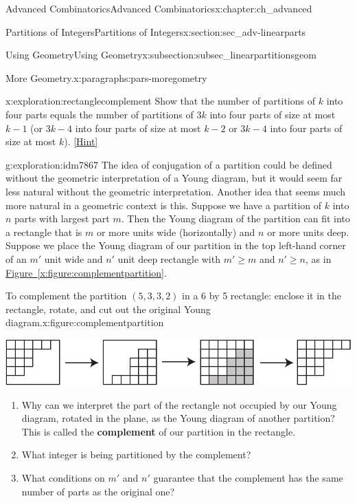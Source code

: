 \documentclass[oneside,10pt,]{book}
\newcommand{\terminology}[1]{\textbf{#1}}
\numberwithin{equation}{chapter}
\begin{document}
\begin{chapterptx}{Advanced Combinatorics}{}{Advanced Combinatorics}{}{}{x:chapter:ch_advanced}
\begin{sectionptx}{Partitions of Integers}{}{Partitions of Integers}{}{}{x:section:sec_adv-linearparts}
\begin{subsectionptx}{Using Geometry}{}{Using Geometry}{}{}{x:subsection:subsec_linearpartitionsgeom}
\begin{paragraphs}{More Geometry.}{x:paragraphs:pars-moregometry}
\begin{exploration}{}{x:exploration:rectanglecomplement}
Show that the number of partitions of \(k\) into four parts equals the number of partitions of \(3k\) into four parts of size at most \(k-1\) (or \(3k-4\) into four parts of size at most \(k-2\) or \(3k-4\) into four parts of size at most \(k\)).%
\space\hspace*{0pt}\hfill{\tiny\hyperlink{g:hint:idm7851-back}{[Hint]}}\end{exploration}
\begin{exploration}{}{g:exploration:idm7867}%
The idea of conjugation of a partition could be defined without the geometric interpretation of a Young diagram, but it would seem far less natural without the geometric interpretation. Another idea that seems much more natural in a geometric context is this. Suppose we have a partition of \(k\) into \(n\) parts with largest part \(m\). Then the Young diagram of the partition can fit into a rectangle that is \(m\) or more units wide (horizontally) and \(n\) or more units deep. Suppose we place the Young diagram of our partition in the top left-hand corner of an \(m'\) unit wide and \(n'\) unit deep rectangle with \(m'\ge m\) and \(n' \ge n\), as in \hyperref[x:figure:complementpartition]{Figure~\ref{x:figure:complementpartition}}.%
\begin{figureptx}{To complement the partition \((5,3,3,2)\) in a 6 by 5 rectangle: enclose it in the rectangle, rotate, and cut out the original Young diagram.}{x:figure:complementpartition}%
\begin{image}{0.15}{0.7}{0.15}%
\includegraphics[width=\linewidth]{images/complementpartition}
\end{image}%
\tcblower
\end{figureptx}%
\begin{enumerate}[font=\bfseries,label=(\alph*),ref=\alph*]
\item{}Why can we interpret the part of the rectangle not occupied by our Young diagram, rotated in the plane, as the Young diagram of another partition? This is called the \terminology{complement} of our partition in the rectangle.%
\item{}What integer is being partitioned by the complement?%
\item{}What conditions on \(m'\) and \(n'\) guarantee that the complement has the same number of parts as the original one?%

\end{enumerate}
\end{exploration}
\end{paragraphs}
\end{subsectionptx}
\end{sectionptx}
\end{chapterptx}
\end{document}

